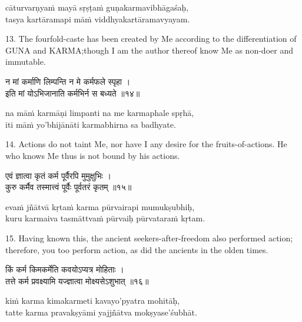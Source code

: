 \begin{transliteration}
cāturvarṇyaṁ mayā sṛṣṭaṁ guṇakarmavibhāgaśaḥ, \\
tasya kartāramapi māṁ viddhyakartāramavyayam.
\end{transliteration}

13. The fourfold-caste has been created by Me according to the differentiation
of GUNA and KARMA;\@ though I am the author thereof know Me as non-doer and
immutable.

\begin{gitaverse}
न मां कर्माणि लिम्पन्ति न मे कर्मफले स्पृहा । \\
इति मां योऽभिजानाति कर्मभिर्न स बध्यते ॥१४॥
\end{gitaverse}

\begin{transliteration}
na māṁ karmāṇi limpanti na me karmaphale spṛhā, \\
iti māṁ yo'bhijānāti karmabhirna sa badhyate.
\end{transliteration}

14. Actions do not taint Me, nor have I any desire for the fruits-of-actions.
He who knows Me thus is not bound by his actions.

\begin{gitaverse}
एवं ज्ञात्वा कृतं कर्म पूर्वैरपि मुमुक्षुभिः । \\
कुरु कर्मैव तस्मात्त्वं पूर्वैः पूर्वतरं कृतम् ॥१५॥
\end{gitaverse}

\begin{transliteration}
evaṁ jñātvā kṛtaṁ karma pūrvairapi mumukṣubhiḥ, \\
kuru karmaiva tasmāttvaṁ pūrvaiḥ pūrvataraṁ kṛtam.
\end{transliteration}

15. Having known this, the ancient seekers-after-freedom also performed action;
therefore, you too perform action, as did the ancients in the olden times.

\begin{gitaverse}
किं कर्म किमकर्मेति कवयोऽप्यत्र मोहिताः । \\
तत्ते कर्म प्रवक्ष्यामि यज्ज्ञात्वा मोक्ष्यसेऽशुभात् ॥१६॥
\end{gitaverse}

\begin{transliteration}
kiṁ karma kimakarmeti kavayo'pyatra mohitāḥ, \\
tatte karma pravakṣyāmi yajjñātva mokṣyase'śubhāt.
\end{transliteration}

